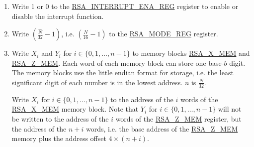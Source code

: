 \documentclass[main\_\_EN.tex]{subfiles}
\begin{document}
\begin{enumerate}

    \item Write 1 or 0 to the \hyperref[regdesc:RSAINTERRUPTENAREG]{RSA\_INTERRUPT\_ENA\_REG} register to enable or disable the interrupt function.
    
    \item Write \begin{math}( \frac{\hat{N}}{32} - 1 )\end{math}, i.e. \begin{math}( \frac{N}{16} - 1 )\end{math} to the \hyperref[regdesc:RSAMODEXPMODEREG]{RSA\_MODE\_REG} register.

    \item Write \begin{math}{X}_{i}\end{math} and \begin{math}{Y}_{i}\end{math} for \begin{math}i \in \{ 0, 1, \dots, n-1 \} \end{math} to memory blocks \hyperref[regdesc:RSAmemory]{RSA\_X\_MEM} and \hyperref[regdesc:RSAmemory]{RSA\_Z\_MEM}. Each word of each memory block can store one base-\begin{math}b\end{math} digit. The memory blocks use the little endian format for storage, i.e. the least significant digit of each number is in the lowest address. \begin{math}n\end{math} is \begin{math} \frac{N}{32} \end{math}.
        
         Write \begin{math}{X}_{i}\end{math} for \begin{math}i \in \{ 0, 1, \dots, n-1 \} \end{math} to the address of the \begin{math}i\end{math} words of the \hyperref[regdesc:RSAmemory]{RSA\_X\_MEM} memory block. Note that \begin{math}{Y}_{i}\end{math} for \begin{math}i \in \{ 0, 1, \dots, n-1 \} \end{math} will not be written to the address of the \begin{math}i\end{math} words of the \hyperref[regdesc:RSAmemory]{RSA\_Z\_MEM} register, but the address of the \begin{math}n+i\end{math} words, i.e. the base address of the \hyperref[regdesc:RSAmemory]{RSA\_Z\_MEM} memory plus the address offset \begin{math}4 \times (n+i) \end{math}.
        

\end{enumerate}
\end{document}

